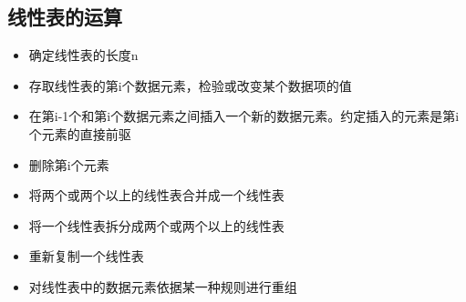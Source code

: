 \documentclass[AutoFakeBold]{LZUThesis2007}
\begin{document}
		\subsection{线性表的运算}
			\begin{itemize}
				\item 确定线性表的长度n

				\item 存取线性表的第i个数据元素，检验或改变某个数据项的值
				\item 在第i-1个和第i个数据元素之间插入一个新的数据元素。约定插入的元素是第i个元素的直接前驱
				\item 删除第i个元素
				\item 将两个或两个以上的线性表合并成一个线性表
				\item 将一个线性表拆分成两个或两个以上的线性表
				\item 重新复制一个线性表
				\item 对线性表中的数据元素依据某一种规则进行重组
			\end{itemize}
\end{document}
